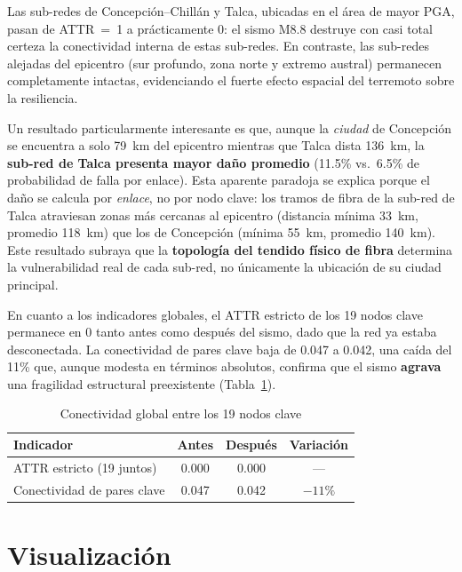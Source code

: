 \documentclass[12pt,a4paper]{article}
\begin{document}
Las sub-redes de Concepción--Chillán y Talca, ubicadas en el área de mayor
PGA, pasan de ATTR~=~1 a prácticamente 0: el sismo M8.8 destruye con casi
total certeza la conectividad interna de estas sub-redes.  En contraste,
las sub-redes alejadas del epicentro (sur profundo, zona norte y extremo
austral) permanecen completamente intactas, evidenciando el fuerte efecto
espacial del terremoto sobre la resiliencia.

Un resultado particularmente interesante es que, aunque la \textit{ciudad}
de Concepción se encuentra a solo 79~km del epicentro mientras que Talca
dista 136~km, la \textbf{sub-red de Talca presenta mayor daño promedio}
(11.5\% vs.\ 6.5\% de probabilidad de falla por enlace).  Esta aparente
paradoja se explica porque el daño se calcula por \textit{enlace}, no por
nodo clave: los tramos de fibra de la sub-red de Talca atraviesan zonas
más cercanas al epicentro (distancia mínima 33~km, promedio 118~km) que
los de Concepción (mínima 55~km, promedio 140~km).  Este resultado
subraya que la \textbf{topología del tendido físico de fibra} determina
la vulnerabilidad real de cada sub-red, no únicamente la ubicación de su
ciudad principal.

En cuanto a los indicadores globales, el ATTR estricto de los 19 nodos
clave permanece en 0 tanto antes como después del sismo, dado que la red
ya estaba desconectada.  La conectividad de pares clave baja de 0.047 a
0.042, una caída del 11\% que, aunque modesta en términos absolutos,
confirma que el sismo \textbf{agrava} una fragilidad estructural
preexistente (Tabla~\ref{tab:global}).

\begin{table}[H]
\centering
\caption{Conectividad global entre los 19 nodos clave}
\label{tab:global}
\begin{tabular}{lccc}
\toprule
\textbf{Indicador} & \textbf{Antes} & \textbf{Después} & \textbf{Variación} \\
\midrule
ATTR estricto (19 juntos)  & 0.000 & 0.000 & --- \\
Conectividad de pares clave & 0.047 & 0.042 & $-11\%$ \\
\bottomrule
\end{tabular}
\end{table}


\section{Visualización}
\end{document}
